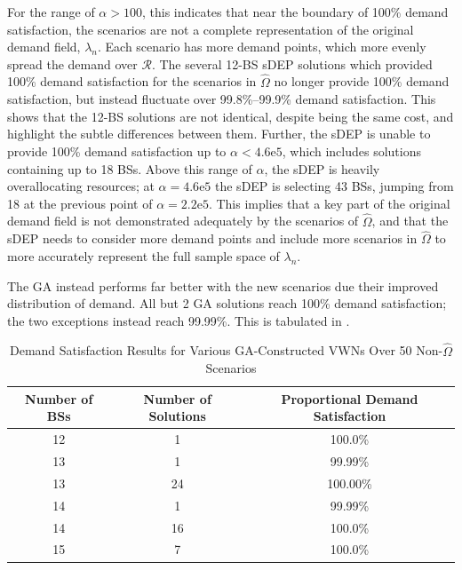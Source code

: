 \documentclass[12pt,dvipsnames]{report}
\newcommand{\expnumber}[2]{{#1}\mathrm{e}{#2}}
\begin{document}
For the range of $\alpha > 100$, this indicates that near the boundary of 100\% demand satisfaction, the scenarios are not a complete representation of the original demand field, $\lambda_n$.  Each scenario has more demand points, which more evenly spread the demand over $\mathcal{R}$.  The several 12-BS sDEP solutions which provided 100\% demand satisfaction for the scenarios in $\hat{\Omega}$ no longer provide 100\% demand satisfaction, but instead fluctuate over 99.8\%--99.9\% demand satisfaction.  This shows that the 12-BS solutions are not identical, despite being the same cost, and highlight the subtle differences between them.  Further, the sDEP is unable to provide 100\% demand satisfaction up to $\alpha < \expnumber{4.6}{5}$, which includes solutions containing up to 18 BSs.  Above this range of $\alpha$, the sDEP is heavily overallocating resources; at $\alpha = \expnumber{4.6}{5}$ the sDEP is selecting 43 BSs, jumping from 18 at the previous point of $\alpha = \expnumber{2.2}{5}$.  This implies that a key part of the original demand field is not demonstrated adequately by the scenarios of $\hat{\Omega}$, and that the sDEP needs to consider more demand points and include more scenarios in $\hat{\Omega}$ to more accurately represent the full sample space of $\lambda_n$.

The GA instead performs far better with the new scenarios due their improved distribution of demand.  All but 2 GA solutions reach 100\% demand satisfaction; the two exceptions instead reach 99.99\%.  This is tabulated in .

\begin{table}[tp]
\centering
\caption[Preliminary Simulation Demand Satisfaction of GA-Constructed VWNs and New Scenarios]{Demand Satisfaction Results for Various GA-Constructed VWNs Over 50 Non-$\hat{\Omega}$ Scenarios}
\begin{tabular}{|c|c|c|} 
\hline
\textbf{Number of BSs} & \textbf{Number of Solutions} & \textbf{Proportional Demand Satisfaction} \\
\hline
12 & 1 & 100.0\% \\
\hline
13 & 1 & 99.99\% \\
\hline
13 & 24 & 100.00\% \\
\hline
14 & 1 & 99.99\% \\
\hline
14 & 16 & 100.0\% \\
\hline
15 & 7 & 100.0\% \\
\hline
\end{tabular}
\label{tab:Prelim_GAEvalDemandSatisfaction}
\end{table}
\end{document}
